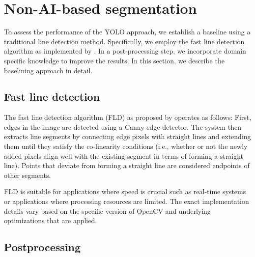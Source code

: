 \documentclass[Master,MDS,english]{BASE/twbook} %
\begin{document}
\section{Non-AI-based segmentation}

To assess the performance of the YOLO approach, we establish a baseline using a traditional line detection method. Specifically, we employ the fast line detection algorithm as implemented by \cite{FLD}. In a post-processing step, we incorporate domain specific knowledge to improve the results.
In this section, we describe the baselining approach in detail.
 
 \subsection{Fast line detection}


The fast line detection algorithm (FLD) as proposed by \cite{fld_inproceedings} operates as follows: 
First, edges in the image are detected using a Canny edge detector. The system then extracts line segments by connecting edge pixels with straight lines and extending them until they satisfy the co-linearity conditions (i.e., whether or not the newly added pixels align well with the existing segment in terms of forming a straight line). Points that deviate from forming a straight line are considered endpoints of other segments. 

FLD is suitable for applications where speed is crucial such as real-time systems or applications where processing resources are limited.
The exact implementation details vary based on the specific version of OpenCV and underlying optimizations that are applied.

\subsection{Postprocessing}
\end{document}
